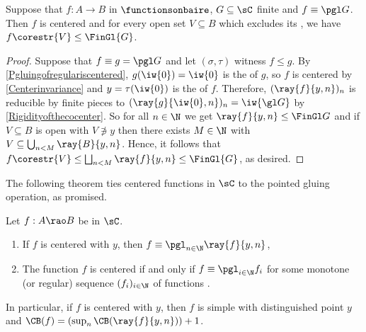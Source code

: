 \begin{corollary}\label{ResidualCorestrictionOfCentered}
Suppose that $f:A\to B$ in $\functionsonbaire$, $G\subseteq \sC$ finite and $f\equiv \pgl G$. Then $f$ is centered and for every open set $V\subseteq B$ which excludes its \cocenter{}, we have $f\corestr{V}\leq \FinGl{G}$.
\end{corollary}


\begin{proof}
Suppose that $f\equiv g=\pgl G$ and let $(\sigma,\tau)$ witness $f\leq g$. By \cref{Pgluingofregulariscentered}, $g(\iw{0})=\iw{0}$ is the \cocenter{} of $g$, so $f$ is centered by \cref{Centerinvariance} and $y=\tau(\iw{0})$ is the \cocenter{} of $f$. Therefore, $(\ray{f}{y,n})_n$ is reducible by finite pieces to $(\ray{g}{\iw{0},n})_n=\iw{\gl G}$ by \cref{Rigidityofthecocenter}.
So for all $n\in\N$ we get $\ray{f}{y,n}\leq\FinGl G$ and if $V\subseteq B$ is open with $V\notni y$ then there exists $M\in\N$ with $V\subseteq \bigcup_{n<M}\ray{B}{y,n}$. Hence, it follows that $f\corestr{V}\leq \bigsqcup_{n<M}\ray{f}{y,n}\leq  \FinGl{G}$, as desired.
\end{proof}

The following theorem ties centered functions in $\sC$ to the pointed gluing operation, as promised. 
\begin{theorem}\label{CenteredasPgluing}
Let $f:A\rao B$ be in $\sC$.
\begin{enumerate}
\item If $f$ is centered with \cocenter{} $y$, then $f\equiv\pgl_{n\in \N}\ray{f}{y,n}$, \label{CenteredasPgluing_def} 
\item The function $f$ is centered if and only if $f\equiv\pgl_{i\in\N} f_i$ for some monotone (or regular) sequence $(f_i)_{i\in\N}$ of functions .\label{CenteredasPgluing_mono}
\end{enumerate}
In particular, if $f$ is centered with \cocenter{} $y$, then $f$ is simple with distinguished point $y$ and $\CB(f)=(\sup_n\CB(\ray{f}{y,n}))+1$.
\end{theorem}

